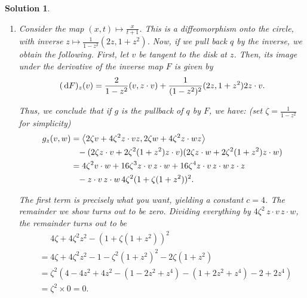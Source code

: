 \documentclass{article}
\theoremstyle{plain}
\theoremstyle{nonumberplain}
\newtheorem{sol}{Solution}
\DeclarePairedDelimiter{\braket}{\langle}{\rangle}
\begin{document}
\begin{sol}
\begin{enumerate}
Since $A$ is linear, its derivative is identified with itself. Moreover, since the inner product on the hyperboloid is defined by $q$, it suffices to check that $A$ preserves $q$. To do so, we use the following trick. For $\zeta, \xi$ tangent to the hyperboloid:
\begin{equation}
4 q(A\zeta, A\xi) = Q(A(\zeta + \xi)) - Q(A(\zeta - \xi)) = Q(\zeta + \xi) - Q(\zeta - \xi) = 4 q(\zeta, \xi).
\end{equation}

\item Consider the map $(x,t) \mapsto \frac x{t+1}$. This is a diffeomorphism onto the circle, with inverse $z \mapsto \frac1{1-z^2}(2z, 1+z^2)$. Now, if we pull back $q$ by the inverse, we obtain the following. First, let $v$ be tangent to the disk at $z$. Then, its image under the derivative of the inverse map $F$ is given by
\begin{equation}
(\dl F)_z(v) = \frac2{1-z^2}(v, z \cdot v) + \frac1{(1-z^2)^2}(2z, 1+z^2) 2 z \cdot v.
\end{equation}

Thus, we conclude that if $g$ is the pullback of $q$ by $F$, we have: (set $\zeta = \frac1{1-z^2}$ for simplicity)
\begin{equation}
\begin{aligned}
g_z(v,w) &= \braket*{2 \zeta v + 4 \zeta^2 z \cdot v z, 2 \zeta w + 4 \zeta^2 z \cdot w z}\\
&\phantom{= } - (2 \zeta z \cdot v + 2 \zeta^2 (1 + z^2) z \cdot v)(2 \zeta z \cdot w + 2 \zeta^2 (1 + z^2) z \cdot w)\\
&= 4 \zeta^2 v \cdot w + 16 \zeta^3 z \cdot v \, z \cdot w + 16 \zeta^4 z \cdot v \, z \cdot w \, z \cdot z\\
&\phantom{= } - z \cdot v \, z \cdot w \, 4 \zeta^2 (1 + \zeta(1+z^2))^2.
\end{aligned}
\end{equation}

The first term is precisely what you want, yielding a constant $c = 4$. The remainder we show turns out to be zero. Dividing everything by $4 \zeta^2 \, z \cdot v \, z \cdot w$, the remainder turns out to be
\begin{equation}
\begin{aligned}
&\mathrel{\phantom{=}} 4 \zeta + 4 \zeta^2 z^2 - (1 + \zeta (1+z^2))^2\\
&= 4 \zeta + 4 \zeta^2 z^2 - 1 - \zeta^2 (1+z^2)^2 - 2 \zeta (1+z^2)\\
&= \zeta^2 (4 - 4 z^2 + 4 z^2 - (1 - 2 z^2 + z^4) - (1 + 2 z^2 + z^4) - 2 + 2 z^4)\\
&= \zeta^2 \times 0 = 0.
\end{aligned}
\end{equation}


\end{enumerate}
\end{sol}
\end{document}
